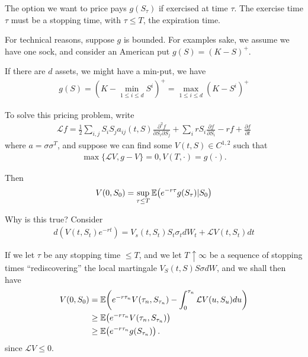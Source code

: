 The option we want to price pays $g(S_{\tau})$ if
exercised at time $\tau$. The exercise time $\tau$ must be a stopping
time, with $\tau \leq T$, the expiration time.

For technical reasons, suppose $g$ is bounded.  For examples sake, we
assume we have one sock, and consider an American put $g(S) = (K -
S)^{+}$.

If there are $d$ assets, we might have a min-put, we have
\begin{align}
  \label{eq:132}
  g(S) = (K - \min_{1 \leq i \leq d} S^{i})^{+} = \max_{1 \leq i \leq d} (K
  - S^{i})^{+}
\end{align}

To solve this pricing problem, write
\begin{align}
  \label{eq:133}
  \mathcal{L} f = \frac{1}{2} \sum_{i, j} S_{i} S_{j} a_{ij}(t, S)
  \frac{\partial^{2} f}{\partial S_{i} \partial S_{j}} + \sum_{i} r
  S_{i} \frac{\partial f}{\partial S_{i}} - rf + \frac{\partial
    f}{\partial t}
\end{align}  where $a = \sigma \sigma^{T}$, and suppose we can find
some $V(t, S) \in C^{1, 2}$ such that
\begin{align}
  \label{eq:134}
  \max \{ \mathcal{L} V, g - V \} = 0, V(T, \cdot) = g(\cdot).
\end{align}

Then
\begin{align}
  \label{eq:135}
  V(0, S_{0}) = \sup_{\tau \leq T} \E{e^{-r\tau} g(S_{\tau}) | S_{0}}
\end{align}

Why is this true?  Consider
\begin{align}
  \label{eq:136}
  d(V(t, S_{t}) e^{-rt}) = V_{s}(t, S_{t}) S_{t} \sigma_{t} dW_{t} + \mathcal{L} V(t,
  S_{t}) dt
\end{align}

If we let $\tau$ be any stopping time $\leq T$, and we let $T_{}
\uparrow \infty$ be a sequence of stopping times ``rediscovering'' the local
martingale $V_{S}(t, S) S \sigma dW$, and we shall then have
\begin{align}
  \label{eq:137}
  V(0, S_{0}) &= \E{e^{-r \tau_{n}} V(\tau_{n}, S_{\tau_{n}}) -
    \int_{0}^{\tau_{n}} \mathcal{L} V(u, S_{u}) du} \\
  &\geq \E{e^{-r \tau_{n}} V(\tau_{n}, S_{\tau_{n}})} \\
  &\geq \E{e^{-r\tau_{n}} g(S_{\tau_{n}})}.
\end{align} since $\mathcal{L} V \leq 0$.

